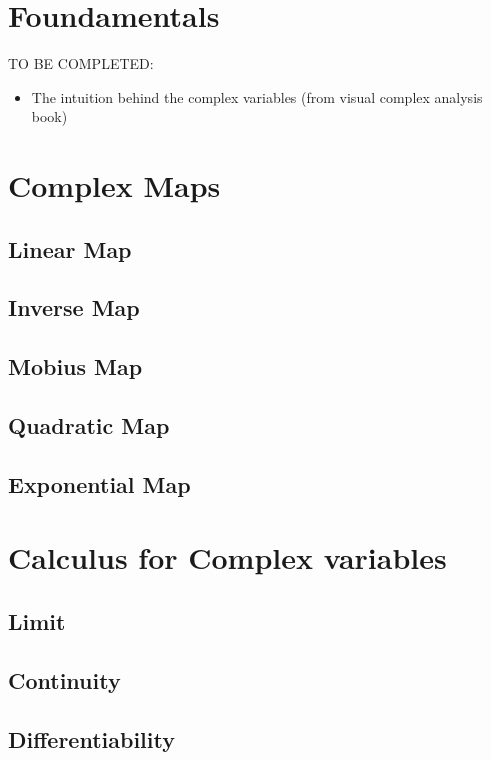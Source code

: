 \section{Foundamentals}

TO BE COMPLETED:

\begin{itemize}
\item The intuition behind the complex variables (from visual complex analysis book)


\end{itemize}




\section{Complex Maps}

\subsection{Linear Map}

\subsection{Inverse Map}

\subsection{Mobius Map}

\subsection{Quadratic Map}

\subsection{Exponential Map}


\section{Calculus for Complex variables}

\subsection{Limit}

\subsection{Continuity}

\subsection{Differentiability}